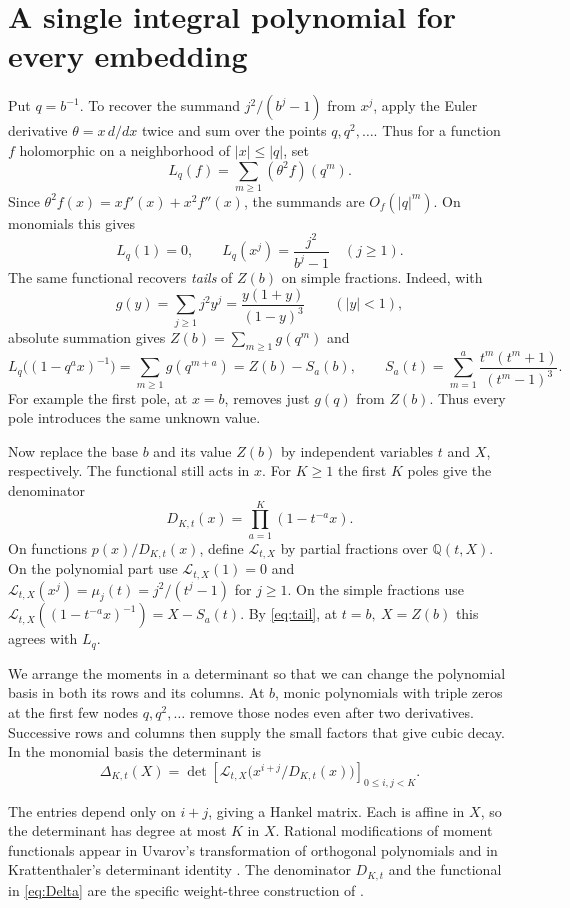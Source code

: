 \documentclass[11pt,letterpaper]{article}
\numberwithin{equation}{section}
\newcommand{\Q}{\mathbb Q}
\begin{document}
\section{A single integral polynomial for every embedding}\label{sec:poly}

Put \(q=b^{-1}\). To recover the summand \(j^2/(b^j-1)\) from
\(x^j\), apply the Euler derivative \(\theta=x\,d/dx\) twice and sum
over the points \(q,q^2,\ldots\). Thus for a function \(f\)
holomorphic on a neighborhood of \(\lvert x\rvert\le |q|\), set
\[
                  L_q(f)=\sum_{m\ge1}(\theta^2 f)(q^m).
\]
Since \(\theta^2 f(x)=xf'(x)+x^2 f''(x)\), the summands are
\(O_f(|q|^m)\). On monomials this gives
\[
 L_q(1)=0,\qquad L_q(x^j)=\frac{j^2}{b^j-1}\quad(j\ge1).
\]
The same functional recovers \emph{tails} of \(Z(b)\) on simple
fractions. Indeed, with
\[
 g(y)=\sum_{j\ge1}j^2 y^j=\frac{y(1+y)}{(1-y)^3}\qquad(|y|<1),
\]
absolute summation gives \(Z(b)=\sum_{m\ge1}g(q^m)\) and
\begin{equation}\label{eq:tail}
 L_q\big((1-q^a x)^{-1}\big)=\sum_{m\ge1}g(q^{m+a})
    =Z(b)-S_a(b),\qquad
 S_a(t)=\sum_{m=1}^a\frac{t^m(t^m+1)}{(t^m-1)^3}.
\end{equation}
For example the first pole, at \(x=b\), removes just \(g(q)\)
from \(Z(b)\). Thus every pole introduces the same unknown value.

Now replace the base \(b\) and its value \(Z(b)\) by independent
variables \(t\) and \(X\), respectively. The functional still acts
in \(x\). For \(K\ge1\) the first \(K\) poles give the denominator
\[
                    D_{K,t}(x)=\prod_{a=1}^K(1-t^{-a}x).
\]
On functions \(p(x)/D_{K,t}(x)\), define \(\mathcal L_{t,X}\) by
partial fractions over \(\Q(t,X)\). On the polynomial part use
\(\mathcal L_{t,X}(1)=0\) and
\(\mathcal L_{t,X}(x^j)=\mu_j(t)=j^2/(t^j-1)\) for \(j\ge1\).
On the simple fractions use
\(\mathcal L_{t,X}((1-t^{-a}x)^{-1})=X-S_a(t)\).
By \eqref{eq:tail}, at \(t=b,\ X=Z(b)\) this agrees with \(L_q\).

\begin{samepage}
We arrange the moments in a determinant so that we can change the
polynomial basis in both its rows and its columns. At \(b\), monic
polynomials with triple zeros at the first few nodes \(q,q^2,\ldots\)
remove those nodes even after two derivatives. Successive rows and
columns then supply the small factors that give cubic decay.
In the monomial basis the determinant is
\begin{equation}\label{eq:Delta}
 \Delta_{K,t}(X)=\det\left[
    \mathcal L_{t,X}\big(x^{i+j}/D_{K,t}(x)\big)
                         \right]_{0\le i,j<K}.
\end{equation}
\end{samepage}
The entries depend only on \(i+j\), giving a Hankel matrix. Each is
affine in \(X\), so the determinant has degree at most \(K\) in \(X\).
Rational modifications of moment functionals appear in Uvarov's
transformation of orthogonal polynomials \cite[\S1]{Uvarov} and in
Krattenthaler's determinant identity \cite[Theorem~1]{Kratt}.
The denominator \(D_{K,t}\) and the functional in \eqref{eq:Delta}
are the specific weight-three construction of \cite[\S1]{Uplift}.
\end{document}
